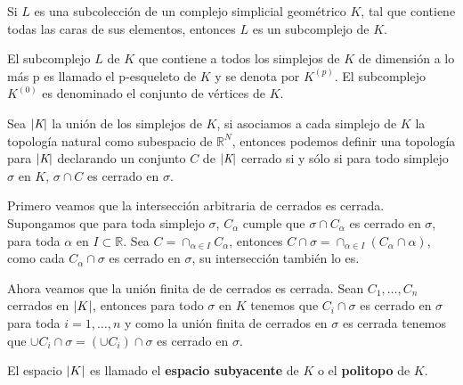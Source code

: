 \begin{Prop}
Si $\textit{L}$ es una subcolección de un complejo simplicial geométrico $\textit{K}$, tal que contiene todas las caras de sus elementos, entonces $\textit{L}$ es un subcomplejo de $\textit{K}$.
\end{Prop}

\begin{Defi}
El subcomplejo $\textit{L}$ de $\textit{K}$ que contiene a todos los simplejos de $\textit{K}$ de dimensión a lo más p es llamado el p-esqueleto de $\textit{K}$ y se denota por $\textit{K}^{(p)}$. 
El subcomplejo $\textit{K}^{(0)}$ es denominado el conjunto de vértices de $\textit{K}$.
\end{Defi}

\begin{Teo}
Sea $\left| \textit{K} \right|$ la unión de los simplejos de $\textit{K}$, si asociamos a cada simplejo de $\textit{K}$ la topología natural como subespacio de $\mathbb{R}^N$, entonces podemos definir una topología para $\left| \textit{K} \right|$ declarando  un conjunto $C$ de  $\left| \textit{K} \right|$ cerrado si y sólo si para todo simplejo $\sigma$ en  $\textit{K}$, $\sigma\cap C$ es cerrado en $\sigma$.
\end{Teo}
\begin{Dem}

Primero veamos que la intersección  arbitraria de cerrados es cerrada. Supongamos que para toda simplejo $\sigma$, $C_{\alpha}$ cumple que $\sigma\cap C_{\alpha}$ es cerrado en $\sigma$, para toda $\alpha$ en $I\subset \mathbb{R}$.
Sea $C = \cap_{\alpha \in I}C_{\alpha}$, entonces $C\cap\sigma = \cap_{\alpha\in I}(C_{\alpha}\cap\alpha)$, como cada $C_{\alpha}\cap \sigma$ es cerrado en $\sigma$, su intersección también lo es.

Ahora veamos que la unión finita de de cerrados es cerrada. Sean $C_1,\ldots,C_n$ cerrados en $\left| K \right|$, entonces para todo $\sigma$ en $K$ tenemos que $C_i \cap \sigma$ es cerrado en $\sigma$ para toda $i =1,\ldots,n$ y como la unión finita de cerrados en $\sigma$ es cerrada tenemos que $\cup C_i\cap\sigma = (\cup C_i)\cap\sigma$ es cerrado en $\sigma$.
\end{Dem}
El espacio $\left| K \right|$ es llamado el \textbf{espacio subyacente} de $K$ o el \textbf{politopo} de $K$.

